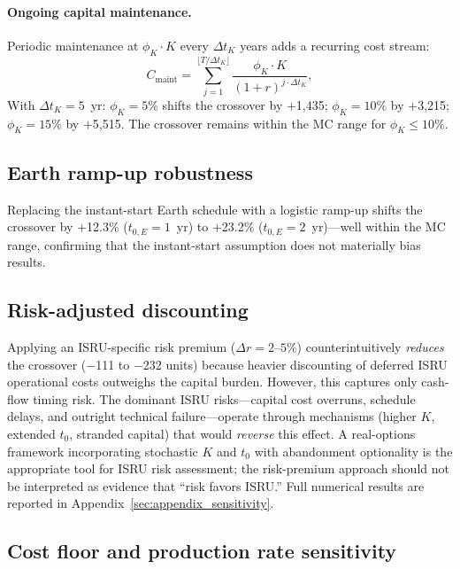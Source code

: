\documentclass[preprint,12pt]{elsarticle}
\begin{document}
\paragraph{Ongoing capital maintenance.} Periodic maintenance at $\phi_K \cdot K$ every $\Delta t_K$ years adds a recurring cost stream:
\begin{equation}
  C_{\mathrm{maint}} = \sum_{j=1}^{\lfloor T/\Delta t_K \rfloor} \frac{\phi_K \cdot K}{(1+r)^{j \cdot \Delta t_K}},
\end{equation}
With $\Delta t_K = 5$~yr: $\phi_K = 5\%$ shifts the crossover by $+$1{,}435; $\phi_K = 10\%$ by $+$3{,}215; $\phi_K = 15\%$ by $+$5{,}515. The crossover remains within the MC range for $\phi_K \leq 10\%$.

\subsection{Earth ramp-up robustness}
\label{sec:earth_ramp}

Replacing the instant-start Earth schedule with a logistic ramp-up shifts the crossover by $+$12.3\% ($t_{0,E} = 1$~yr) to $+$23.2\% ($t_{0,E} = 2$~yr)---well within the MC range, confirming that the instant-start assumption does not materially bias results.

\subsection{Risk-adjusted discounting}
\label{sec:risk_premium}

Applying an ISRU-specific risk premium ($\Delta r = 2$--$5\%$) counterintuitively \emph{reduces} the crossover ($-$111 to $-$232 units) because heavier discounting of deferred ISRU operational costs outweighs the capital burden. However, this captures only cash-flow timing risk. The dominant ISRU risks---capital cost overruns, schedule delays, and outright technical failure---operate through mechanisms (higher $K$, extended $t_0$, stranded capital) that would \emph{reverse} this effect. A real-options framework incorporating stochastic $K$ and $t_0$ with abandonment optionality is the appropriate tool for ISRU risk assessment; the risk-premium approach should not be interpreted as evidence that ``risk favors ISRU.'' Full numerical results are reported in Appendix~\ref{sec:appendix_sensitivity}.

\subsection{Cost floor and production rate sensitivity}
\label{sec:cfloor_prodrate}
\end{document}

